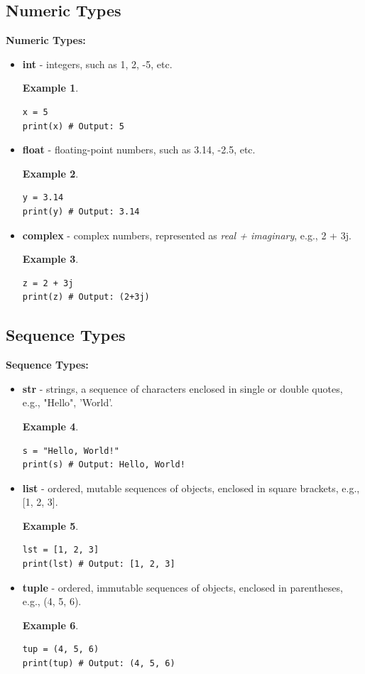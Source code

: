 \documentclass[12pt]{article}
\newtheorem{Example}{Example}[section]
\begin{document}
\subsection{Numeric Types}
\textbf{Numeric Types:}
\begin{itemize}
\item \textbf{int} - integers, such as 1, 2, -5, etc.\\
\begin{Example}
\begin{lstlisting}
x = 5
print(x) # Output: 5
\end{lstlisting}
\end{Example}
\item \textbf{float} - floating-point numbers, such as 3.14, -2.5, etc.\\
\begin{Example}
\begin{lstlisting}
y = 3.14
print(y) # Output: 3.14
\end{lstlisting}
\end{Example}
\item \textbf{complex} - complex numbers, represented as \textit{real + imaginary}, e.g., 2 + 3j.\\
\begin{Example}
\begin{lstlisting}
z = 2 + 3j
print(z) # Output: (2+3j)
\end{lstlisting}
\end{Example}
\end{itemize}



\subsection{Sequence Types}
\textbf{Sequence Types:}
\begin{itemize}
\item \textbf{str} - strings, a sequence of characters enclosed in single or double quotes, e.g., "Hello", 'World'.
\begin{Example}
\begin{lstlisting}
s = "Hello, World!"
print(s) # Output: Hello, World!
\end{lstlisting}
\end{Example}
\item \textbf{list} - ordered, mutable sequences of objects, enclosed in square brackets, e.g., [1, 2, 3].
\begin{Example}
\begin{lstlisting}
lst = [1, 2, 3]
print(lst) # Output: [1, 2, 3]
\end{lstlisting}
\end{Example}
\item \textbf{tuple} - ordered, immutable sequences of objects, enclosed in parentheses, e.g., (4, 5, 6).
\begin{Example}
\begin{lstlisting}
tup = (4, 5, 6)
print(tup) # Output: (4, 5, 6)
\end{lstlisting}
\end{Example}
\end{itemize}
\end{document}
